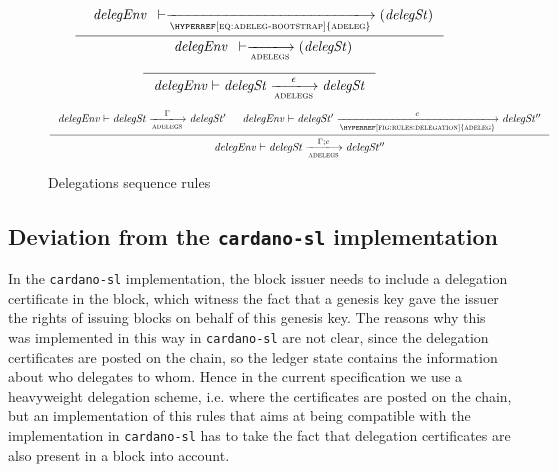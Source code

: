 \begin{figure}
  \begin{equation}
    \inference
    {
      {\begin{array}{l}
         \var{delegEnv}
      \end{array}}
      \vdash
      \trans{\hyperref[eq:adeleg-bootstrap]{adeleg}}{}
      \left(
        \var{delegSt}
      \right)
    }
    {
      {\begin{array}{l}
         \var{delegEnv}
      \end{array}}
      \vdash
      \trans{adelegs}{}
      \left(
        \var{delegSt}
      \right)
    }
  \end{equation}
  \nextdef
  \begin{equation}
    \label{eq:rule:delegation-seq-base}
    \inference
    {}
    {
      \var{delegEnv}
      \vdash
      \var{delegSt}
      \trans{adelegs}{\epsilon}
      \var{delegSt}
    }
  \end{equation}
  \nextdef
  \begin{equation}
    \label{eq:rule:delegation-seq-ind}
    \inference
    {
      \var{delegEnv}
      \vdash
      \var{delegSt}
      \trans{adelegs}{\Gamma}
      \var{delegSt'}
      &
      \var{delegEnv}
      \vdash
      \var{delegSt'}
      \trans{\hyperref[fig:rules:delegation]{adeleg}}{c}
      \var{delegSt''}
    }
    {
      \var{delegEnv}
      \vdash
      \var{delegSt}
      \trans{adelegs}{\Gamma; c}
      \var{delegSt''}
    }
  \end{equation}
  \caption{Delegations sequence rules}
  \label{fig:rules:delegation-seq}
\end{figure}

\subsection{Deviation from the \texttt{cardano-sl} implementation}
\label{sec:delegation:deviation-cardano-sl-imp}

In the \texttt{cardano-sl} implementation, the block issuer needs to include a
delegation certificate in the block, which witness the fact that a genesis key
gave the issuer the rights of issuing blocks on behalf of this genesis key. The
reasons why this was implemented in this way in \texttt{cardano-sl} are not
clear, since the delegation certificates are posted on the chain, so the ledger
state contains the information about who delegates to whom. Hence in the
current specification we use a heavyweight delegation scheme, i.e. where the
certificates are posted on the chain, but an implementation of this rules that
aims at being compatible with the implementation in \texttt{cardano-sl} has to
take the fact that delegation certificates are also present in a block into
account.
